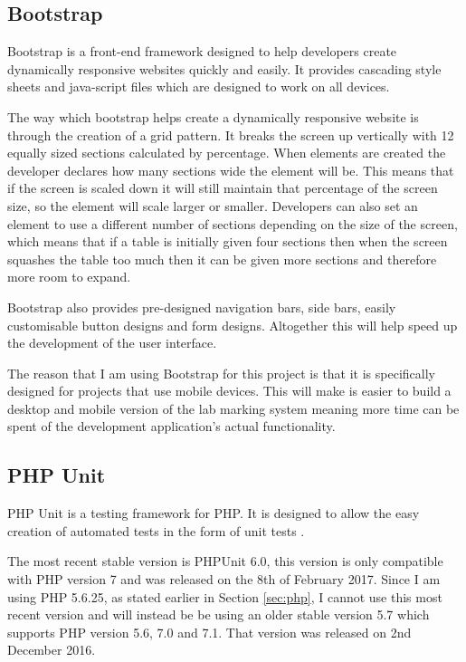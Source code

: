 \documentclass[11pt]{report}
\begin{document}
\subsection{Bootstrap}
Bootstrap is a front-end framework \cite{_bootstrap_????-1} designed to help developers create dynamically responsive websites quickly and easily. It provides cascading style sheets and java-script files which are designed to work on all devices.

The way which bootstrap helps create a dynamically responsive website is through the creation of a grid pattern. It breaks the screen up vertically with 12 equally sized sections calculated by percentage. When elements are created the developer declares how many sections wide the element will be. This means that if the screen is scaled down it will still maintain that percentage of the screen size, so the element will scale larger or smaller. Developers can also set an element to use a different number of sections depending on the size of the screen, which means that if a table is initially given four sections then when the screen squashes the table too much then it can be given more sections and therefore more room to expand.

Bootstrap also provides pre-designed navigation bars, side bars, easily customisable button designs and form designs. Altogether this will help speed up the development of the user interface.

The reason that I am using Bootstrap for this project is that it is specifically designed for projects that use mobile devices. This will make is easier to build a desktop and mobile version of the lab marking system meaning more time can be spent of the development application's actual functionality.



\subsection{PHP Unit}

PHP Unit is a testing framework for PHP. It is designed to allow the easy creation of automated tests in the form of unit tests \cite{bergmann_phpunit_2005}. 

The most recent stable version is PHPUnit 6.0, this version is only compatible with PHP version 7 and was released on the 8th of February 2017. Since I am using PHP 5.6.25, as stated earlier in Section \ref{sec:php}, I cannot use this most recent version and will instead be be using an older stable version 5.7 which supports PHP version 5.6, 7.0 and 7.1. That version was released on 2nd December 2016.
\end{document}
